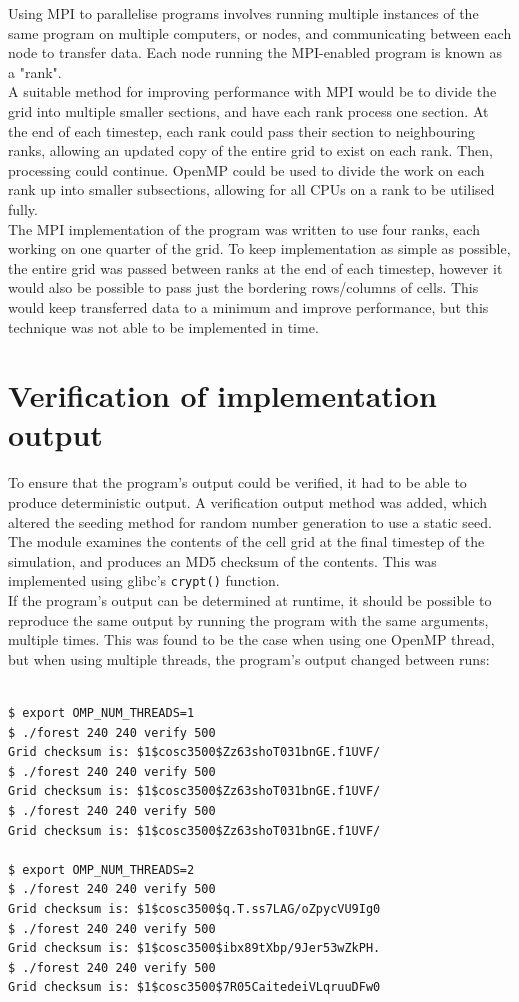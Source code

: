 \documentclass[11pt,a4paper]{report}
\begin{document}
Using MPI to parallelise programs involves running multiple instances of the
same program on multiple computers, or nodes, and communicating between each
node to transfer data. Each node running the MPI-enabled program is known as a
"rank".\\

A suitable method for improving performance with MPI would be to divide the
grid into multiple smaller sections, and have each rank process one section. At
the end of each timestep, each rank could pass their section to neighbouring
ranks, allowing an updated copy of the entire grid to exist on each rank. Then,
processing could continue. OpenMP could be used to divide the work on each rank
up into smaller subsections, allowing for all CPUs on a rank to be utilised
fully.\\

The MPI implementation of the program was written to use four ranks, each
working on one quarter of the grid. To keep implementation as simple as
possible, the entire grid was passed between ranks at the end of each timestep,
however it would also be possible to pass just the bordering rows/columns of
cells. This would keep transferred data to a minimum and improve performance,
but this technique was not able to be implemented in time.


\newpage
\section{Verification of implementation output}

To ensure that the program's output could be verified, it had to be able to
produce deterministic output. A verification output method was added, which
altered the seeding method for random number generation to use a static seed.
The module examines the contents of the cell grid at the final timestep of the
simulation, and produces an MD5 checksum of the contents. This was implemented
using glibc's \texttt{crypt()} function.\\

If the program's output can be determined at runtime, it should be possible to
reproduce the same output by running the program with the same arguments,
multiple times. This was found to be the case when using one OpenMP thread, but
when using multiple threads, the program's output changed between runs:


\begin{verbatim}

$ export OMP_NUM_THREADS=1
$ ./forest 240 240 verify 500
Grid checksum is: $1$cosc3500$Zz63shoT031bnGE.f1UVF/
$ ./forest 240 240 verify 500
Grid checksum is: $1$cosc3500$Zz63shoT031bnGE.f1UVF/
$ ./forest 240 240 verify 500
Grid checksum is: $1$cosc3500$Zz63shoT031bnGE.f1UVF/

$ export OMP_NUM_THREADS=2
$ ./forest 240 240 verify 500
Grid checksum is: $1$cosc3500$q.T.ss7LAG/oZpycVU9Ig0
$ ./forest 240 240 verify 500
Grid checksum is: $1$cosc3500$ibx89tXbp/9Jer53wZkPH.
$ ./forest 240 240 verify 500
Grid checksum is: $1$cosc3500$7R05CaitedeiVLqruuDFw0

\end{verbatim}
\end{document}
